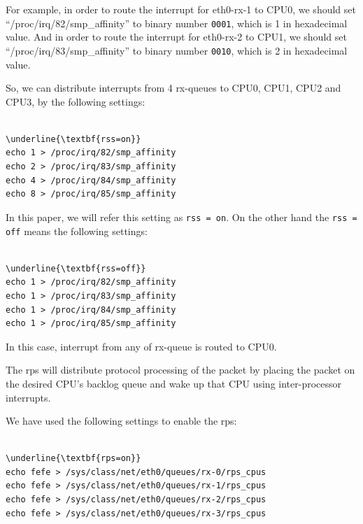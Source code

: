 For example, in order to route the interrupt for eth0-rx-1 to CPU0, 
we should set \enquote{/proc/irq/82/smp\_affinity} 
to binary number {\tt 0001}, which is 1 in hexadecimal value.
And in order to route the interrupt for eth0-rx-2 to CPU1, we 
should set \enquote{/proc/irq/83/smp\_affinity} 
to binary number {\tt 0010}, which is 2 in hexadecimal value.

So, we can distribute interrupts from 4 rx-queues to CPU0, CPU1, CPU2 and CPU3, by the following settings: 

\begin{center}
\begin{minipage}{0.8\columnwidth}
\begin{Verbatim}[commandchars=\\\{\}]

\underline{\textbf{rss=on}}
echo 1 > /proc/irq/82/smp_affinity
echo 2 > /proc/irq/83/smp_affinity
echo 4 > /proc/irq/84/smp_affinity
echo 8 > /proc/irq/85/smp_affinity

\end{Verbatim}
\end{minipage}
\end{center}

In this paper, we will refer this setting as {\tt rss = on}.
On the other hand the {\tt rss = off} means the following settings:

\begin{center}
\begin{minipage}{0.8\columnwidth}
\begin{Verbatim}[commandchars=\\\{\}]

\underline{\textbf{rss=off}}
echo 1 > /proc/irq/82/smp_affinity
echo 1 > /proc/irq/83/smp_affinity
echo 1 > /proc/irq/84/smp_affinity
echo 1 > /proc/irq/85/smp_affinity

\end{Verbatim}
\end{minipage}
\end{center}

In this case, interrupt from any of rx-queue is routed to CPU0.

The rps will distribute protocol processing of the packet by placing the packet
on the desired CPU's backlog queue and wake up that CPU using inter-processor interrupts.

We have used the following settings to enable the rps:

\begin{center}
\begin{minipage}{0.8\columnwidth}
\begin{Verbatim}[commandchars=\\\{\}]

\underline{\textbf{rps=on}}
echo fefe > /sys/class/net/eth0/queues/rx-0/rps_cpus
echo fefe > /sys/class/net/eth0/queues/rx-1/rps_cpus
echo fefe > /sys/class/net/eth0/queues/rx-2/rps_cpus
echo fefe > /sys/class/net/eth0/queues/rx-3/rps_cpus

\end{Verbatim}
\end{minipage}
\end{center}

